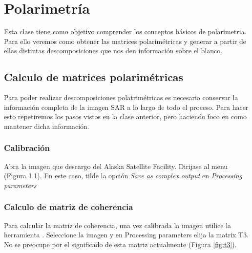 \chapter{Polarimetría}

Esta clase tiene como objetivo comprender los conceptos básicos de polarimetria. Para ello veremos como obtener las matrices polarimétricas y generar a partir de ellas distintas descomposiciones que nos den información sobre el blanco.

\section{Calculo de matrices polarimétricas}

Para poder realizar descomposiciones polatrimétricas es necesario conservar la información completa de la imagen SAR a lo largo de todo el proceso. Para hacer esto repetiremos los pasos vistos en la clase anterior, pero haciendo foco en como mantener dicha información.

\subsection{Calibración}
Abra la imagen  que descargo del Alaska Satellite Facility.  Dirijase al menu  (Figura \ref{fig:calibrar}). En este caso, tilde la opción \emph{Save as complex output} en \emph{Processing parameters}

\begin{figure}[h!]
    \centering
    \hfill
    \caption{}
    \label{fig:calibrar}
\end{figure}

\subsection{Calculo de matriz de coherencia}

Para calcular la matriz de coherencia, una vez calibrada la imagen utilice la herramienta . Seleccione la imagen  y en Processing parameters elija la matrix T3. No se preocupe por el significado de esta matriz actualmente (Figura \ref{fig:t3}).

